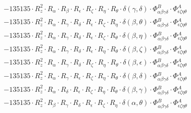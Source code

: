 \documentclass{article}
\begin{document}
\begin{equation}
\begin{array}{c}
 \\[0.2em] 		 - 135135 \cdot R_{z}^{2} \cdot R_{\alpha{}} \cdot R_{\beta{}} \cdot R_{\epsilon{}} \cdot R_{\zeta{}} \cdot R_{\eta{}} \cdot R_{\theta{}} \cdot \delta{}\left(\gamma{}, \delta{}\right) \cdot \Phi{}^{B}_{\alpha{}\beta{}\gamma{}\delta{}} \cdot \Phi{}^{A}_{\epsilon{}\zeta{}\eta{}\theta{}} 
 \\[0.2em] 		 - 135135 \cdot R_{z}^{2} \cdot R_{\alpha{}} \cdot R_{\gamma{}} \cdot R_{\delta{}} \cdot R_{\epsilon{}} \cdot R_{\zeta{}} \cdot R_{\eta{}} \cdot \delta{}\left(\beta{}, \theta{}\right) \cdot \Phi{}^{B}_{\alpha{}\beta{}\gamma{}\delta{}} \cdot \Phi{}^{A}_{\epsilon{}\zeta{}\eta{}\theta{}} 
 \\[0.2em] 		 - 135135 \cdot R_{z}^{2} \cdot R_{\alpha{}} \cdot R_{\gamma{}} \cdot R_{\delta{}} \cdot R_{\epsilon{}} \cdot R_{\zeta{}} \cdot R_{\theta{}} \cdot \delta{}\left(\beta{}, \eta{}\right) \cdot \Phi{}^{B}_{\alpha{}\beta{}\gamma{}\delta{}} \cdot \Phi{}^{A}_{\epsilon{}\zeta{}\eta{}\theta{}} 
 \\[0.2em] 		 - 135135 \cdot R_{z}^{2} \cdot R_{\alpha{}} \cdot R_{\gamma{}} \cdot R_{\delta{}} \cdot R_{\epsilon{}} \cdot R_{\eta{}} \cdot R_{\theta{}} \cdot \delta{}\left(\beta{}, \zeta{}\right) \cdot \Phi{}^{B}_{\alpha{}\beta{}\gamma{}\delta{}} \cdot \Phi{}^{A}_{\epsilon{}\zeta{}\eta{}\theta{}} 
 \\[0.2em] 		 - 135135 \cdot R_{z}^{2} \cdot R_{\alpha{}} \cdot R_{\gamma{}} \cdot R_{\delta{}} \cdot R_{\zeta{}} \cdot R_{\eta{}} \cdot R_{\theta{}} \cdot \delta{}\left(\beta{}, \epsilon{}\right) \cdot \Phi{}^{B}_{\alpha{}\beta{}\gamma{}\delta{}} \cdot \Phi{}^{A}_{\epsilon{}\zeta{}\eta{}\theta{}} 
 \\[0.2em] 		 - 135135 \cdot R_{z}^{2} \cdot R_{\alpha{}} \cdot R_{\gamma{}} \cdot R_{\epsilon{}} \cdot R_{\zeta{}} \cdot R_{\eta{}} \cdot R_{\theta{}} \cdot \delta{}\left(\beta{}, \delta{}\right) \cdot \Phi{}^{B}_{\alpha{}\beta{}\gamma{}\delta{}} \cdot \Phi{}^{A}_{\epsilon{}\zeta{}\eta{}\theta{}} 
 \\[0.2em] 		 - 135135 \cdot R_{z}^{2} \cdot R_{\alpha{}} \cdot R_{\delta{}} \cdot R_{\epsilon{}} \cdot R_{\zeta{}} \cdot R_{\eta{}} \cdot R_{\theta{}} \cdot \delta{}\left(\beta{}, \gamma{}\right) \cdot \Phi{}^{B}_{\alpha{}\beta{}\gamma{}\delta{}} \cdot \Phi{}^{A}_{\epsilon{}\zeta{}\eta{}\theta{}} 
 \\[0.2em] 		 - 135135 \cdot R_{z}^{2} \cdot R_{\beta{}} \cdot R_{\gamma{}} \cdot R_{\delta{}} \cdot R_{\epsilon{}} \cdot R_{\zeta{}} \cdot R_{\eta{}} \cdot \delta{}\left(\alpha{}, \theta{}\right) \cdot \Phi{}^{B}_{\alpha{}\beta{}\gamma{}\delta{}} \cdot \Phi{}^{A}_{\epsilon{}\zeta{}\eta{}\theta{}} 

\end{array}
\end{equation}
\end{document}

